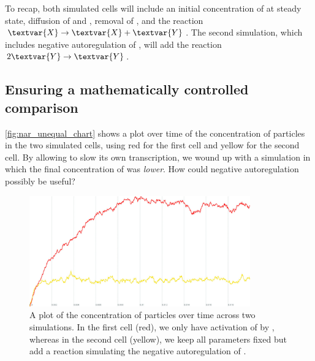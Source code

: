 To recap, both simulated cells will include an initial concentration of  at steady state, diffusion of  and , removal of , and the reaction $\textvar{X} \rightarrow \textvar{X} + \textvar{Y}$. The second simulation, which includes negative autoregulation of , will add the reaction $2\textvar{Y} \rightarrow \textvar{Y}$.\\

\begin{note}\end{note}

\FloatBarrier
{}
\subsection{Ensuring a mathematically controlled comparison}

\autoref{fig:nar_unequal_chart} shows a plot over time of the concentration of  particles in the two simulated cells, using red for the first cell and yellow for the second cell. By allowing  to slow its own transcription, we wound up with a simulation in which the final concentration of  was \textit{lower}. How could negative autoregulation possibly be useful?

\begin{figure}[h]
\centering
\mySfFamily
\includegraphics[width = 0.85\textwidth]{../images_CMYK/cellblender_nar_unequal_chart_white}
\caption{A plot of the concentration of  particles over time across two simulations. In the first cell (red), we only have activation of  by , whereas in the second cell (yellow), we keep all parameters fixed but add a reaction simulating the negative autoregulation of .}
\label{fig:nar_unequal_chart}
\end{figure}

